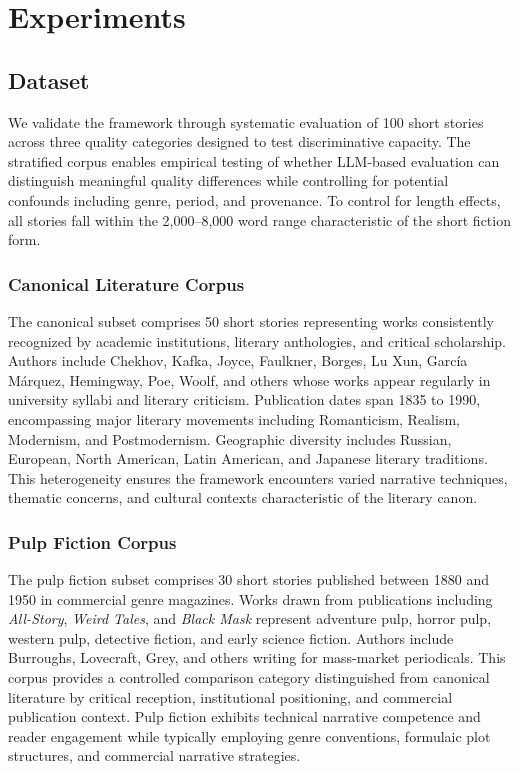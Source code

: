 \section{Experiments}

\subsection{Dataset}

We validate the framework through systematic evaluation of 100 short stories across three quality categories designed to test discriminative capacity. The stratified corpus enables empirical testing of whether LLM-based evaluation can distinguish meaningful quality differences while controlling for potential confounds including genre, period, and provenance. To control for length effects, all stories fall within the 2,000--8,000 word range characteristic of the short fiction form.

\subsubsection{Canonical Literature Corpus}

The canonical subset comprises 50 short stories representing works consistently recognized by academic institutions, literary anthologies, and critical scholarship. Authors include Chekhov, Kafka, Joyce, Faulkner, Borges, Lu Xun, García Márquez, Hemingway, Poe, Woolf, and others whose works appear regularly in university syllabi and literary criticism. Publication dates span 1835 to 1990, encompassing major literary movements including Romanticism, Realism, Modernism, and Postmodernism. Geographic diversity includes Russian, European, North American, Latin American, and Japanese literary traditions. This heterogeneity ensures the framework encounters varied narrative techniques, thematic concerns, and cultural contexts characteristic of the literary canon.

\subsubsection{Pulp Fiction Corpus}

The pulp fiction subset comprises 30 short stories published between 1880 and 1950 in commercial genre magazines. Works drawn from publications including \textit{All-Story}, \textit{Weird Tales}, and \textit{Black Mask} represent adventure pulp, horror pulp, western pulp, detective fiction, and early science fiction. Authors include Burroughs, Lovecraft, Grey, and others writing for mass-market periodicals. This corpus provides a controlled comparison category distinguished from canonical literature by critical reception, institutional positioning, and commercial publication context. Pulp fiction exhibits technical narrative competence and reader engagement while typically employing genre conventions, formulaic plot structures, and commercial narrative strategies.

